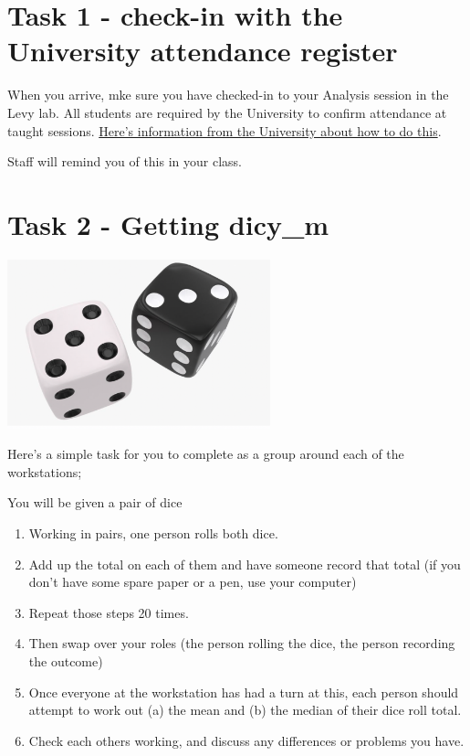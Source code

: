 \documentclass[
]{book}
\begin{document}
\hypertarget{task-1---check-in-with-the-university-attendance-register}{%
\section{Task 1 - check-in with the University attendance register}\label{task-1---check-in-with-the-university-attendance-register}}

When you arrive, mke sure you have checked-in to your Analysis session in the Levy lab. All students are required by the University to confirm attendance at taught sessions. \href{https://www.lancaster.ac.uk/student-and-education-services/check-in/}{Here's information from the University about how to do this}.

Staff will remind you of this in your class.

\hypertarget{task-2---getting-dicy_m}{%
\section{Task 2 - Getting dicy\_m}\label{task-2---getting-dicy_m}}

\includegraphics[width=3in,height=\textheight]{docs/files/Week_1/dice.png}

Here's a simple task for you to complete as a group around each of the workstations;

You will be given a pair of dice

\begin{enumerate}
\def\labelenumi{\arabic{enumi}.}
\item
  Working in pairs, one person rolls both dice.
\item
  Add up the total on each of them and have someone record that total (if you don't have some spare paper or a pen, use your computer)
\item
  Repeat those steps 20 times.
\item
  Then swap over your roles (the person rolling the dice, the person recording the outcome)
\item
  Once everyone at the workstation has had a turn at this, each person should attempt to work out (a) the mean and (b) the median of their dice roll total.
\item
  Check each others working, and discuss any differences or problems you have.
\end{enumerate}
\end{document}
